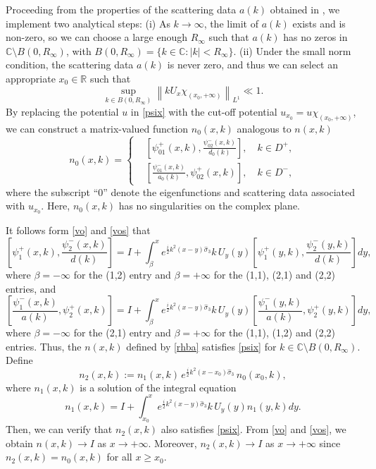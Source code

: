\documentclass[preprint,compress,12pt]{elsarticle}
\numberwithin{equation}{section}
\begin{document}
Proceeding from the properties of the scattering data $a(k)$ obtained in \cite{Chengglo}, we implement two analytical steps: (i) As $k\rightarrow\infty$, the limit of $a(k)$ exists and is non-zero, so we can choose a large enough $R_{\infty}$ such that $a(k)$ has no zeros in $\mathbb{C}\setminus B(0,R_{\infty})$, with $B(0,R_{\infty})=\{k\in\mathbb{C}:|k|<R_{\infty}\}$.
(ii) Under the small norm condition, the scattering data $a(k)$ is never zero, and thus we can select an appropriate $x_{0}\in\mathbb{R}$ such that
\begin{equation*}
\sup_{k\in B(0,R_{\infty})}\left\|kU_{x}\chi_{(x_{0},+\infty)}\right\|_{L^{1}}\ll1.
\end{equation*}
By replacing the potential $u$ in \eqref{psix} with the cut-off potential $u_{x_{0}}=u\chi_{(x_{0},+\infty)}$, we can construct a matrix-valued function $n_{0}(x,k)$ analogous to $n(x,k)$
\begin{equation}
n_{0}(x,k)=\left\{
\begin{aligned}
&\left[\psi_{01}^{+}(x,k),\frac{\psi_{02}^{-}(x,k)}{d_{0}(k)}\right],\quad k\in D^{+},\\
&\left[\frac{\psi_{01}^{-}(x,k)}{a_{0}(k)},\psi_{02}^{+}(x,k)\right],\quad k\in D^{-},
\end{aligned}
\right.
\end{equation}
where the subscript ``$0$'' denote the eigenfunctions and scattering data associated with $u_{x_0}$. Here, $n_{0}(x,k)$ has no singularities on the complex plane.


It follows form \eqref{vo} and \eqref{vos} that
\begin{equation*}
\left[\psi_{1}^{+}(x,k), \frac{\psi_{2}^{-}(x,k)}{d(k)}\right]=I+\int_{\beta}^{x}e^{\frac{i}{2}k^{2}(x-y)\widehat{\sigma}_{3}}k\,U_{y}(y)\left[\psi_{1}^{+}(y,k),\frac{\psi_{2}^{-}(y,k)}{d(k)}\right]dy,
\end{equation*}
where $\beta=-\infty$ for the (1,2) entry and $\beta=+\infty$ for the (1,1), (2,1) and (2,2) entries, and
\begin{equation*}
\left[\frac{\psi_{1}^{-}(x,k)}{a(k)}, \psi_{2}^{+}(x,k)\right]=I+\int_{\beta}^{x}e^{\frac{i}{2}k^{2}(x-y)\widehat{\sigma}_{3}}k\,U_{y}(y)\left[\frac{\psi_{1}^{-}(y,k)}{a(k)}, \psi_{2}^{+}(y,k)\right]dy,
\end{equation*}
where $\beta=-\infty$ for the (2,1) entry and $\beta=+\infty$ for the (1,1), (1,2) and (2,2) entries. Thus, the $n(x,k)$ defined by \eqref{rhba} satisfies \eqref{psix} for $k\in\mathbb{C}\setminus B(0,R_{\infty})$.  Define
\begin{equation}
n_{2}(x,k):=n_{1}(x,k)\,e^{\frac{i}{2}k^{2}(x-x_{0})\widehat{\sigma}_{3}}\,n_{0}(x_{0},k),
\end{equation}
where $n_{1}(x,k)$ is a solution of the integral equation
\begin{equation*}
n_{1}(x,k)=I+\int_{x_{0}}^{x}e^{\frac{i}{2}k^{2}(x-y)\widehat{\sigma}_{3}}k\,U_{y}(y)n_{1}(y,k)dy.
\end{equation*}
Then, we can verify that $n_{2}(x,k)$ also satisfies \eqref{psix}.  From \eqref{vo} and \eqref{vos}, we obtain $n(x,k)\rightarrow I$ as $x\rightarrow +\infty$.
Moreover, $n_{2}(x,k)\rightarrow I$ as $x\rightarrow +\infty$ since $n_{2}(x,k)=n_{0}(x,k)$ for all $x\geq x_{0}$.
\end{document}
